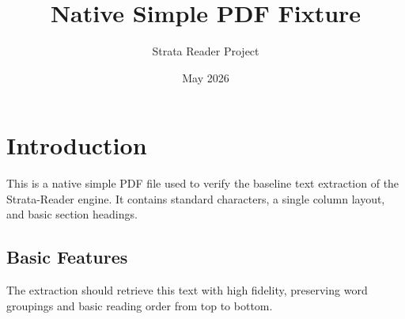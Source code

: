 \documentclass{article}
\title{Native Simple PDF Fixture}
\author{Strata Reader Project}
\date{May 2026}
\begin{document}
\maketitle
\section{Introduction}
This is a native simple PDF file used to verify the baseline text extraction of the Strata-Reader engine.
It contains standard characters, a single column layout, and basic section headings.

\subsection{Basic Features}
The extraction should retrieve this text with high fidelity, preserving word groupings and basic reading order from top to bottom.
\end{document}
